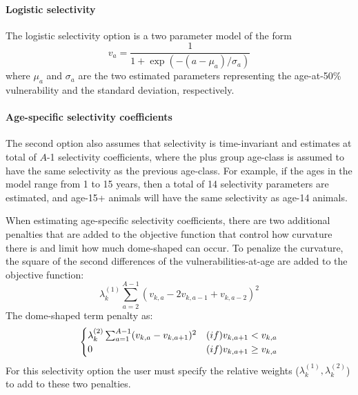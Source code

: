 \begin{multicols}{2}
\paragraph{Logistic selectivity} 
The logistic selectivity option is a two parameter model of the form
\[
v_a = \frac{1}{1+ \exp{(-(a-\mu_{a})/\sigma_a)}}
\]
where $\mu_a$ and $\sigma_a$ are the two estimated parameters representing the age-at-50\% vulnerability and the standard deviation, respectively.

\paragraph{Age-specific selectivity coefficients}
The second option also assumes that selectivity is time-invariant and estimates at total of $A$-1 selectivity coefficients, where the plus group age-class is assumed to have the same selectivity as the previous age-class.  For example, if the ages in the model range from 1 to 15 years, then a total of 14 selectivity parameters are estimated, and age-15+ animals will have the same selectivity as age-14 animals.

When estimating age-specific selectivity coefficients, there are two additional penalties that are added to the objective function that control how curvature there is and limit how much dome-shaped can occur.  To penalize the curvature, the square of the second differences of the vulnerabilities-at-age are added to the objective function: 
\[
\lambda_k^{(1)} \sum_{a=2}^{A-1}(v_{k,a} - 2v_{k,a-1} + v_{k,a-2})^2
\]
The dome-shaped term penalty as:
\[
\begin{cases}
\lambda_k^{(2)} \sum_{a=1}^{A-1}(v_{k,a} - v_{k,a+1})^2& \mbox(if) v_{k,a+1}< v_{k,a}\\
0 & \mbox(if) v_{k,a+1}\geq v_{k,a}
\end{cases}
\]
For this selectivity option the user must specify the relative weights ($\lambda_k^{(1)},\lambda_k^{(2)}$) to add to these two penalties.


\end{multicols}

